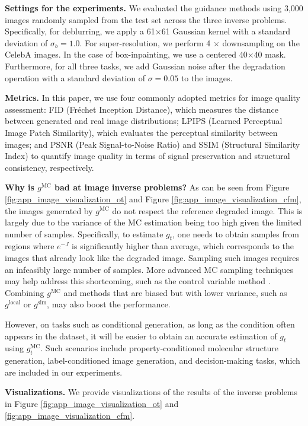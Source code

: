 \textbf{Settings for the experiments.} We evaluated the guidance methods using 3,000 images randomly sampled from the test set across the three inverse problems. Specifically, for deblurring, we apply a 61$\times$61 Gaussian kernel with a standard deviation of $\sigma_b = 1.0$. For super-resolution, we perform 4 $\times$ downsampling on the CelebA images. In the case of box-inpainting, we use a centered 40$\times$40 mask. Furthermore, for all three tasks, we add Gaussian noise after the degradation operation with a standard deviation of $\sigma = 0.05$ to the images.


\textbf{Metrics.} In this paper, we use four commonly adopted metrics for image quality assessment: FID (Fréchet Inception Distance), which measures the distance between generated and real image distributions; LPIPS (Learned Perceptual Image Patch Similarity), which evaluates the perceptual similarity between images; and PSNR (Peak Signal-to-Noise Ratio) and SSIM (Structural Similarity Index) to quantify image quality in terms of signal preservation and structural consistency, respectively.

\textbf{Why is $g^{\text{MC}}$ bad at image inverse problems?}
As can be seen from Figure  \ref{fig:app_image_visualization_ot} and Figure \ref{fig:app_image_visualization_cfm}, the images generated by $g^{\text{MC}}$ do not respect the reference degraded image. This is largely due to the variance of the MC estimation being too high given the limited number of samples. Specifically, to estimate $g_t$, one needs to obtain samples from regions where $e^{-J}$ is significantly higher than average, which corresponds to the images that already look like the degraded image. Sampling such images requires an infeasibly large number of samples. More advanced MC sampling techniques may help address this shortcoming, such as the control variable method \citep{mcbook}. Combining $g^{\text{MC}}$ and methods that are biased but with lower variance, such as $g^{\text{local}}$ or $g^{\text{sim}}$, may also boost the performance.

However, on tasks such as conditional generation, as long as the condition often appears in the dataset, it will be easier to obtain an accurate estimation of $g_t$ using $g^{\text{MC}}_t$. Such scenarios include property-conditioned molecular structure generation, label-conditioned image generation, and decision-making tasks, which are included in our experiments.


\textbf{Visualizations.}
We provide visualizations of the results of the inverse problems in Figure \ref{fig:app_image_visualization_ot} and \ref{fig:app_image_visualization_cfm}.

